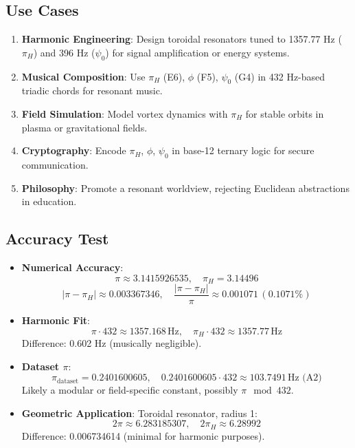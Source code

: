 \documentclass[a4paper,12pt]{article}
\begin{document}
\subsection{Use Cases}
\begin{enumerate}
    \item \textbf{Harmonic Engineering}: Design toroidal resonators tuned to 1357.77 Hz (\(\pi_H\)) and 396 Hz (\(\psi_0\)) for signal amplification or energy systems.
    \item \textbf{Musical Composition}: Use \(\pi_H\) (E6), \(\phi\) (F5), \(\psi_0\) (G4) in 432 Hz-based triadic chords for resonant music.
    \item \textbf{Field Simulation}: Model vortex dynamics with \(\pi_H\) for stable orbits in plasma or gravitational fields.
    \item \textbf{Cryptography}: Encode \(\pi_H\), \(\phi\), \(\psi_0\) in base-12 ternary logic for secure communication.
    \item \textbf{Philosophy}: Promote a resonant worldview, rejecting Euclidean abstractions in education.
\end{enumerate}

\subsection{Accuracy Test}
\begin{itemize}
    \item \textbf{Numerical Accuracy}:
    \[
    \pi \approx 3.1415926535, \quad \pi_H = 3.14496
    \]
    \[
    |\pi - \pi_H| \approx 0.003367346, \quad \frac{|\pi - \pi_H|}{\pi} \approx 0.001071 \, (0.1071\%)
    \]
    
    \item \textbf{Harmonic Fit}:
    \[
    \pi \cdot 432 \approx 1357.168 \, \text{Hz}, \quad \pi_H \cdot 432 \approx 1357.77 \, \text{Hz}
    \]
    Difference: 0.602 Hz (musically negligible).
    
    \item \textbf{Dataset \(\pi\)}:
    \[
    \pi_{\text{dataset}} = 0.2401600605, \quad 0.2401600605 \cdot 432 \approx 103.7491 \, \text{Hz (A2)}
    \]
    Likely a modular or field-specific constant, possibly \(\pi \mod 432\).
    
    \item \textbf{Geometric Application}:
    Toroidal resonator, radius 1:
    \[
    2 \pi \approx 6.283185307, \quad 2 \pi_H \approx 6.28992
    \]
    Difference: 0.006734614 (minimal for harmonic purposes).
\end{itemize}
\end{document}
